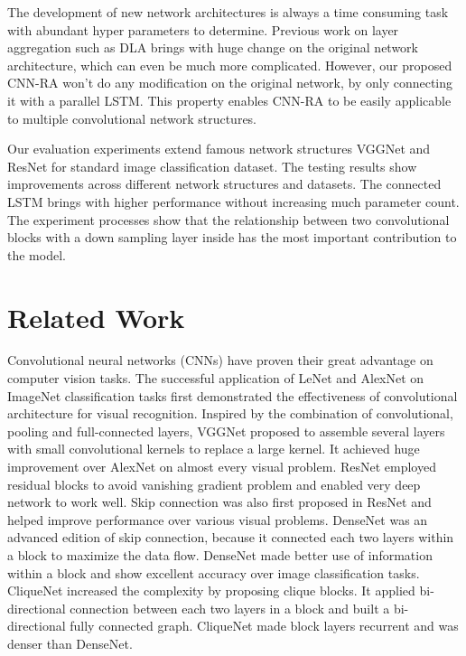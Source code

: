 \documentclass[runningheads]{llncs}
\begin{document}
The development of new network architectures is always a time consuming task with abundant hyper parameters to determine. Previous work on layer aggregation such as DLA\cite{dla} brings with huge change on the original network architecture, which can even be much more complicated. However, our proposed CNN-RA won't do any modification on the original network, by only connecting it with a parallel LSTM. This property enables CNN-RA to be easily applicable to multiple convolutional network structures. 

Our evaluation experiments extend famous network structures VGGNet\cite{vgg} and ResNet\cite{resnet} for standard image classification dataset. The testing results show improvements across different network structures and datasets. The connected LSTM brings with higher performance without increasing much parameter count. The experiment processes show that the relationship between two convolutional blocks with a down sampling layer inside has the most important contribution to the model.



\section{Related Work}
Convolutional neural networks (CNNs) have proven their great advantage on computer vision tasks. The successful application of LeNet\cite{lenet} and AlexNet\cite{alexnet} on ImageNet\cite{imagenet} classification tasks first demonstrated the effectiveness of convolutional architecture for visual recognition. Inspired by the combination of convolutional, pooling and full-connected layers, VGGNet\cite{vgg} proposed to assemble several layers with small convolutional kernels to replace a large kernel. It achieved huge improvement over AlexNet on almost every visual problem. ResNet\cite{resnet} employed residual blocks to avoid vanishing gradient problem and enabled very deep network to work well. Skip connection was also first proposed in ResNet and helped improve performance over various visual problems. DenseNet\cite{densenet} was an advanced edition of skip connection, because it connected each two layers within a block to maximize the data flow. DenseNet made better use of information within a block and show excellent accuracy over image classification tasks. CliqueNet\cite{cliquenet} increased the complexity by proposing clique blocks. It applied bi-directional connection between each two layers in a block and built a bi-directional fully connected graph. CliqueNet made block layers recurrent and was denser than DenseNet.
\end{document}
